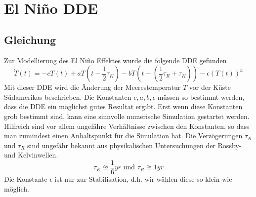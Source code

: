 \section{El Niño DDE}


\subsection{Gleichung}
Zur Modellierung des El Niño Effektes wurde die folgende DDE gefunden %
\begin{equation} \label{eldde}
\dot{T}(t)=-cT(t)+aT(t-\frac{1}{2}\tau_K)-bT(t-(\frac{1}{2}\tau_R+\tau_K))-\epsilon(T(t))^3
\end{equation}
Mit dieser DDE wird die Änderung der Meerestemperatur $T$ vor der Küste Südamerikas beschrieben.
Die Konstanten $c,a,b,\epsilon$ müssen so bestimmt werden, dass die DDE ein möglichst gutes Resultat ergibt.
Erst wenn diese Konstanten grob bestimmt sind, kann eine sinnvolle numerische Simulation gestartet werden.
Hilfreich sind vor allem ungefähre Verhältnisse zwischen den Konstanten, so dass man zumindest einen Anhaltspunkt für die Simulation hat.
Die Verzögerungen $\tau_K$ und $\tau_R$ sind ungefähr bekannt aus physikalischen Untersuchungen der Rossby- und Kelvinwellen.
\begin{equation}
	\tau_K \approxeq \frac{1}{6}yr \text{ und } \tau_R \approxeq 1 yr
\end{equation}
Die Konstante $\epsilon$ ist nur zur Stabilisation, d.h. wir wählen diese so klein wie möglich.


